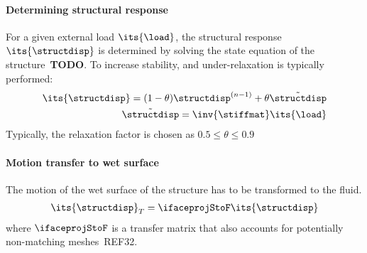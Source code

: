 \documentclass[../main.tex]{subfiles}
\begin{document}
\paragraph{\raisebox{.5pt}{\textcircled{\raisebox{-.9pt} {1}}} Determining structural response}
For a given external load $\its{\load}$, the structural response $\its{\structdisp}$ is determined by solving the state equation of the structure~\textbf{TODO}. To increase stability, and under-relaxation is typically performed:
\begin{align}
\its{\structdisp}=(1-\theta)\structdisp^{(n-1)}+\theta \tilde{\structdisp} \\
\tilde{\structdisp} = \inv{\stiffmat} \its{\load}
\end{align}
Typically, the relaxation factor is chosen as $0.5\leq\theta\leq 0.9$

\paragraph{\raisebox{.5pt}{\textcircled{\raisebox{-.9pt} {2}}} Motion transfer to wet surface}
The motion of the wet surface of the structure has to be transformed to the fluid.
\begin{align}
\its{\structdisp}_T = \ifaceprojStoF \its{\structdisp}
\end{align}
where $\ifaceprojStoF$ is a transfer matrix that also accounts for potentially non-matching meshes~REF32.
\end{document}
